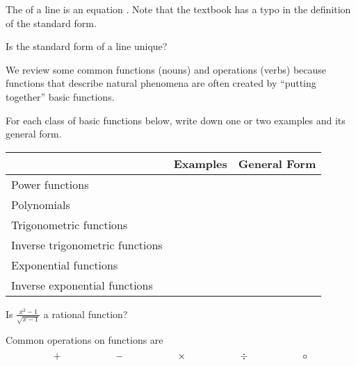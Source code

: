 \documentclass[../main.tex]{subfiles}
\begin{document}

The  of a line is an equation \underline{\hspace{2in}}. \newline
{\scriptsize \faExclamationTriangle{} Note that the textbook has a typo in the definition of the standard form.}


\faComments{} Is the standard form of a line unique?
\clearpage

We review some common functions (nouns) and operations (verbs) because functions that describe natural phenomena are often created by ``putting together'' basic functions.

\begin{example}
  For each class of basic functions below, write down one or two examples and its general form.

  \begin{center}
    \begin{tabular}{p{1.25in}p{3.5in}|p{1.5in}}
      & Examples & General Form \\\midrule
      Power \newline functions & & \\[0.75in]\midrule
      Polynomials & & \\[0.75in]\midrule
      Trigonometric \newline functions & & \\[0.75in]\midrule
      Inverse \newline trigonometric \newline functions & & \\[0.75in]\midrule
      Exponential \newline functions & & \\[0.75in]\midrule
      Inverse \newline exponential \newline functions & & \\[0.75in]
    \end{tabular}
  \end{center}
\end{example}

\faComments{} Is \(\frac{x^{2}-1}{\sqrt{x-1}}\) a rational function?

\clearpage

Common operations on functions are
\[
  + \hspace{0.75in}
  - \hspace{0.75in}
  \times \hspace{0.75in}
  \div \hspace{0.75in}
  \circ
\]
\end{document}
